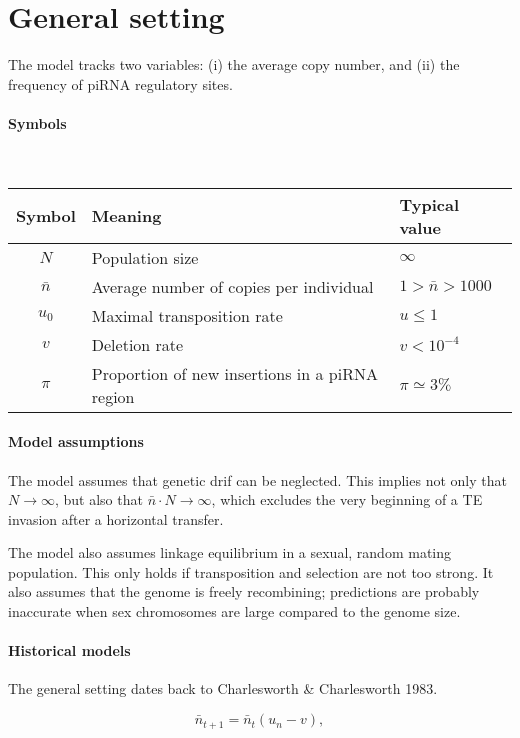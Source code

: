 \documentclass[10pt,a4paper]{article}
\begin{document}
\section{General setting}

The model tracks two variables: (i) the average copy number, and (ii) the frequency of piRNA regulatory sites.

\paragraph{Symbols} \mbox{} \\

\begin{tabular}{cll}
Symbol & Meaning & Typical value \\ \hline
$N$ & Population size & $\infty$ \\
$\bar n$ & Average number of copies per individual & $1 > \bar n > 1000$ \\
$u_0$ & Maximal transposition rate & $u \leq 1$ \\
$v$ & Deletion rate & $v < 10^{-4}$ \\
$\pi$ & Proportion of new insertions in a piRNA region & $\pi \simeq 3\%$ \\
\end{tabular}

\paragraph {Model assumptions} The model assumes that genetic drif can be neglected. This implies not only that $N \rightarrow \infty$, but also that $\bar n \cdot N \rightarrow \infty$, which excludes the very beginning of a TE invasion after a horizontal transfer. 

The model also assumes linkage equilibrium in a sexual, random mating population. This only holds if transposition and selection are not too strong. It also assumes that the genome is freely recombining; predictions are probably inaccurate when sex chromosomes are large compared to the genome size. 

\paragraph {Historical models} The general setting dates back to Charlesworth \& Charlesworth 1983. 

\begin{equation}
\bar n_{t+1} = \bar n_t(u_n - v),
\end{equation}
\end{document}
